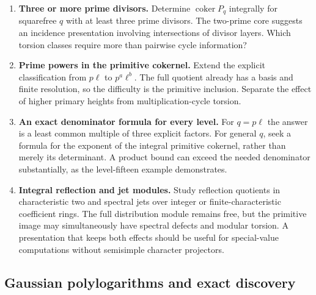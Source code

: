 \documentclass[11pt,a4paper]{article}
\numberwithin{equation}{section}
\theoremstyle{plain}
\theoremstyle{definition}
\theoremstyle{remark}
\begin{document}
\begin{enumerate}[leftmargin=*,label=D\arabic*.]
\item \textbf{Three or more prime divisors.} Determine
$\operatorname{coker}P_q$ integrally for squarefree $q$ with at
least three prime divisors. The two-prime core suggests an
incidence presentation involving intersections of divisor layers.
Which torsion classes require more than pairwise cycle information?

\item \textbf{Prime powers in the primitive cokernel.} Extend
the explicit classification from $p\ell$ to $p^a\ell^b$.
The full quotient already has a basis and finite resolution, so
the difficulty is the primitive inclusion. Separate the effect
of higher primary heights from multiplication-cycle torsion.

\item \textbf{An exact denominator formula for every level.}
For $q=p\ell$ the answer is a least common multiple of three
explicit factors. For general $q$, seek a formula for the exponent
of the integral primitive cokernel, rather than merely its
determinant. A product bound can exceed the needed denominator
substantially, as the level-fifteen example demonstrates.

\item \textbf{Integral reflection and jet modules.} Study
reflection quotients in characteristic two and spectral jets over
integer or finite-characteristic coefficient rings. The full
distribution module remains free, but the primitive image may
simultaneously have spectral defects and modular torsion. A
presentation that keeps both effects should be useful for
special-value computations without semisimple character projectors.
\end{enumerate}

\subsection{Gaussian polylogarithms and exact discovery}
\end{document}
